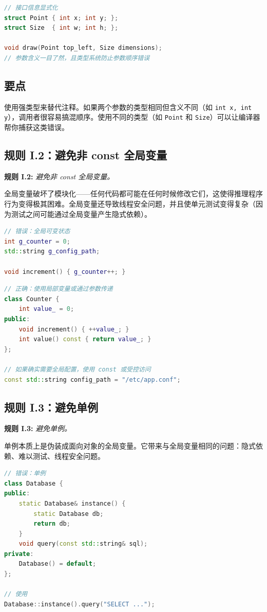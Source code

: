 \begin{lstlisting}[language=C++]
// 接口信息显式化
struct Point { int x; int y; };
struct Size  { int w; int h; };

void draw(Point top_left, Size dimensions);
// 参数含义一目了然，且类型系统防止参数顺序错误
\end{lstlisting}

\subsection{要点}
使用强类型来替代注释。如果两个参数的类型相同但含义不同（如 \texttt{int x, int y}），调用者很容易搞混顺序。使用不同的类型（如 \texttt{Point} 和 \texttt{Size}）可以让编译器帮你捕获这类错误。

\subsection{规则 I.2：避免非 const 全局变量}

\textbf{规则 I.2:} \textit{避免非 const 全局变量。}

全局变量破坏了模块化——任何代码都可能在任何时候修改它们，这使得推理程序行为变得极其困难。全局变量还导致线程安全问题，并且使单元测试变得复杂（因为测试之间可能通过全局变量产生隐式依赖）。

\begin{lstlisting}[language=C++]
// 错误：全局可变状态
int g_counter = 0;
std::string g_config_path;

void increment() { g_counter++; }
\end{lstlisting}

\begin{lstlisting}[language=C++]
// 正确：使用局部变量或通过参数传递
class Counter {
    int value_ = 0;
public:
    void increment() { ++value_; }
    int value() const { return value_; }
};

// 如果确实需要全局配置，使用 const 或受控访问
const std::string config_path = "/etc/app.conf";
\end{lstlisting}

\subsection{规则 I.3：避免单例}

\textbf{规则 I.3:} \textit{避免单例。}

单例本质上是伪装成面向对象的全局变量。它带来与全局变量相同的问题：隐式依赖、难以测试、线程安全问题。

\begin{lstlisting}[language=C++]
// 错误：单例
class Database {
public:
    static Database& instance() {
        static Database db;
        return db;
    }
    void query(const std::string& sql);
private:
    Database() = default;
};

// 使用
Database::instance().query("SELECT ...");
\end{lstlisting}

